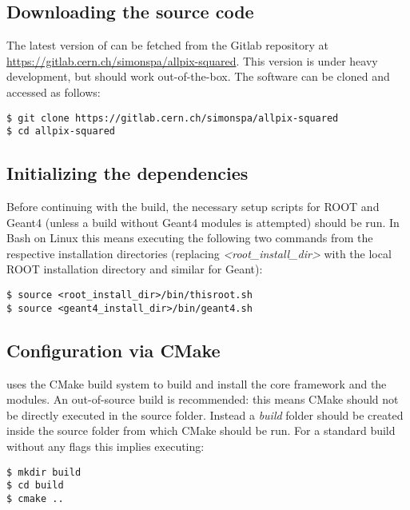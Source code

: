 \subsection{Downloading the source code}
The latest version of \apsq can be fetched from the Gitlab repository at \url{https://gitlab.cern.ch/simonspa/allpix-squared}. This version is under heavy development, but should work out-of-the-box. The software can be cloned and accessed as follows:

\begin{verbatim}
$ git clone https://gitlab.cern.ch/simonspa/allpix-squared
$ cd allpix-squared
\end{verbatim}

\subsection{Initializing the dependencies}
\label{sec:initialize_dependencies}
Before continuing with the build, the necessary setup scripts for ROOT and Geant4 (unless a build without Geant4 modules is attempted) should be run. In Bash on Linux this means executing the following two commands from the respective installation directories (replacing \textit{\textless root\_install\_dir\textgreater} with the local ROOT installation directory and similar for Geant):
\begin{verbatim}
$ source <root_install_dir>/bin/thisroot.sh
$ source <geant4_install_dir>/bin/geant4.sh
\end{verbatim}

\subsection{Configuration via CMake}
\label{sec:cmake_config}
\apsq uses the CMake build system to build and install the core framework and the modules. An out-of-source build is recommended: this means CMake should not be directly executed in the source folder. Instead a \textit{build} folder should be created inside the source folder from which CMake should be run. For a standard build without any flags this implies executing:

\begin{verbatim}
$ mkdir build
$ cd build
$ cmake ..
\end{verbatim}

